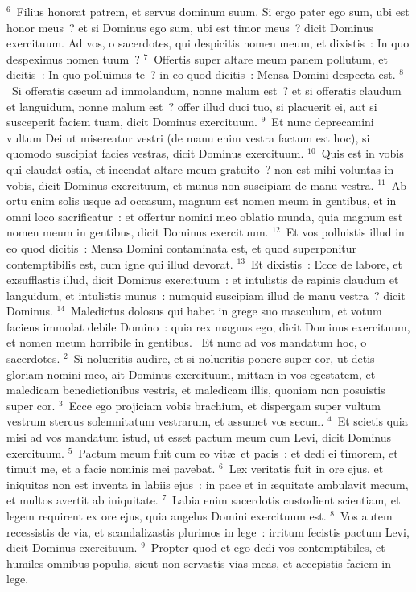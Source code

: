 ${}^{6}$~Filius honorat patrem, et servus dominum suum. Si ergo pater ego sum, ubi est honor meus~? et si Dominus ego sum, ubi est timor meus~? dicit Dominus exercituum. Ad vos, o sacerdotes, qui despicitis nomen meum, et dixistis~: In quo despeximus nomen tuum~?
${}^{7}$~Offertis super altare meum panem pollutum, et dicitis~: In quo polluimus te~? in eo quod dicitis~: Mensa Domini despecta est.
${}^{8}$~Si offeratis c\ae cum ad immolandum, nonne malum est~? et si offeratis claudum et languidum, nonne malum est~? offer illud duci tuo, si placuerit ei, aut si susceperit faciem tuam, dicit Dominus exercituum.
${}^{9}$~Et nunc deprecamini vultum Dei ut misereatur vestri (de manu enim vestra factum est hoc), si quomodo suscipiat facies vestras, dicit Dominus exercituum.
${}^{10}$~Quis est in vobis qui claudat ostia, et incendat altare meum gratuito~? non est mihi voluntas in vobis, dicit Dominus exercituum, et munus non suscipiam de manu vestra.
${}^{11}$~Ab ortu enim solis usque ad occasum, magnum est nomen meum in gentibus, et in omni loco sacrificatur~: et offertur nomini meo oblatio munda, quia magnum est nomen meum in gentibus, dicit Dominus exercituum.
${}^{12}$~Et vos polluistis illud in eo quod dicitis~: Mensa Domini contaminata est, et quod superponitur contemptibilis est, cum igne qui illud devorat.
${}^{13}$~Et dixistis~: Ecce de labore, et exsufflastis illud, dicit Dominus exercituum~: et intulistis de rapinis claudum et languidum, et intulistis munus~: numquid suscipiam illud de manu vestra~? dicit Dominus.
${}^{14}$~Maledictus dolosus qui habet in grege suo masculum, et votum faciens immolat debile Domino~: quia rex magnus ego, dicit Dominus exercituum, et nomen meum horribile in gentibus.
~\lettrine[lines=10,image=true,loversize=0.05,lraise=-0.03]{E}{}t nunc ad vos mandatum hoc, o sacerdotes.
${}^{2}$~Si nolueritis audire, et si nolueritis ponere super cor, ut detis gloriam nomini meo, ait Dominus exercituum, mittam in vos egestatem, et maledicam benedictionibus vestris, et maledicam illis, quoniam non posuistis super cor.
${}^{3}$~Ecce ego projiciam vobis brachium, et dispergam super vultum vestrum stercus solemnitatum vestrarum, et assumet vos secum.
${}^{4}$~Et scietis quia misi ad vos mandatum istud, ut esset pactum meum cum Levi, dicit Dominus exercituum.
${}^{5}$~Pactum meum fuit cum eo vit\ae\ et pacis~: et dedi ei timorem, et timuit me, et a facie nominis mei pavebat.
${}^{6}$~Lex veritatis fuit in ore ejus, et iniquitas non est inventa in labiis ejus~: in pace et in \ae quitate ambulavit mecum, et multos avertit ab iniquitate.
${}^{7}$~Labia enim sacerdotis custodient scientiam, et legem requirent ex ore ejus, quia angelus Domini exercituum est.
${}^{8}$~Vos autem recessistis de via, et scandalizastis plurimos in lege~: irritum fecistis pactum Levi, dicit Dominus exercituum.
${}^{9}$~Propter quod et ego dedi vos contemptibiles, et humiles omnibus populis, sicut non servastis vias meas, et accepistis faciem in lege.


